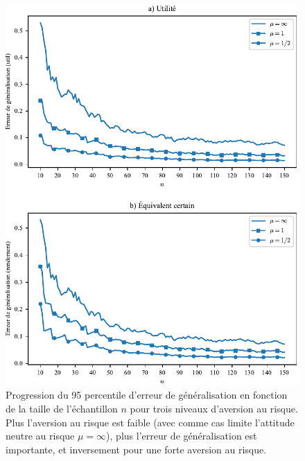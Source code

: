 \begin{figure}[h!]
  \centering
  \includegraphics[width=\textwidth]{../experiments/fig/avrisk_gen.pdf}
  \caption[Aversion au risque et erreur de généralisation]{Progression du 95\ieme
    percentile d'erreur de généralisation en fonction de la taille de l'échantillon $n$
    pour trois niveaux d'aversion au risque. Plus l'aversion au risque est faible (avec
    comme cas limite l'attitude neutre au risque $\mu = \infty$), plus l'erreur de généralisation
    est importante, et inversement pour une forte aversion au risque. }
  \label{fig_avrisk_gen}
\end{figure}



